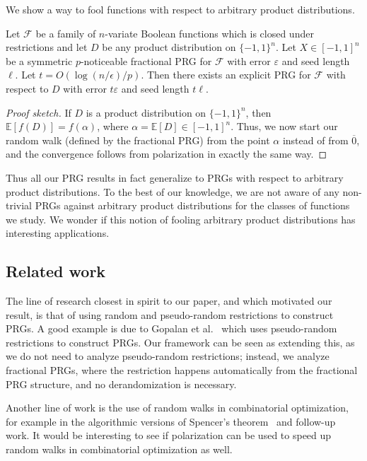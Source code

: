 \documentclass{toc}
\newcommand{\E}{\mathbb{E}}
\newcommand{\FF}{\mathcal{F}}
\newcommand{\eps}{\varepsilon}
\newcommand{\zero}{\overline{0}}
\begin{document}
We show a way to fool functions with respect to arbitrary product distributions.
\begin{corollary}
\label{cor:arbitrary_product_fool}
Let $\FF$ be a family of $n$-variate Boolean functions which is closed under restrictions and let $D$ be any product distribution on $\{-1,1 \}^n$.
Let $X \in [-1,1]^n$ be a symmetric $p$-noticeable fractional PRG for $\FF$ with error $\eps$ and seed length $\ell$. Let $t= O(\log(n/\epsilon)/p)$. Then there exists an explicit  PRG for $\FF$ with respect to $D$ with error $t\eps$ and seed length $t \ell$.
\end{corollary}
\begin{proof}[Proof sketch]If $D$ is a product distribution on $\{-1,1\}^n$, then $\E[f(D)] = f(\alpha)$, where $\alpha=\E[D] \in [-1,1]^{n}$. Thus, we now start our random walk (defined by the fractional PRG) from the point $\alpha$ instead of from $\zero$, and the convergence follows from polarization in exactly the same way.
\end{proof}
Thus all our PRG results in fact generalize to PRGs with respect to arbitrary product distributions. To the best of our knowledge, we are not aware of any non-trivial PRGs against arbitrary product distributions  for the classes of functions we study. We wonder if this notion of fooling arbitrary product distributions has interesting applications.

%
\subsection{Related work}
%
%
The line of research closest in spirit to our paper, and which motivated our result, is that of using random and pseudo-random restrictions
%
%
to construct PRGs. A good example is due to Gopalan et al.~\cite{gopalan2012better} which uses pseudo-random restrictions to construct PRGs. Our framework
can be seen as extending this, as we do not need to analyze pseudo-random restrictions; instead, we analyze fractional PRGs, where the restriction
happens automatically from the fractional PRG structure, and no derandomization is necessary.

Another line of work is the use of random walks in combinatorial optimization, for example in the algorithmic versions of Spencer's theorem~\cite{bansal2010constructive,lovett2012constructive} and
%
follow-up work.     %
It would be interesting to see if polarization can be used
to speed up random walks in combinatorial optimization as well.
\end{document}

